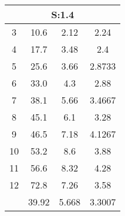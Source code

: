 
	\begin{table}[H]
		\begin{tabular}{c|ccc}
			\multicolumn{4}{c}{S:1.4}\\\hline
			3 & 10.6 & 2.12 & 2.24\\
			4 & 17.7 & 3.48 & 2.4\\
			5 & 25.6 & 3.66 & 2.8733\\
			6 & 33.0 & 4.3 & 2.88\\
			7 & 38.1 & 5.66 & 3.4667\\
			8 & 45.1 & 6.1 & 3.28\\
			9 & 46.5 & 7.18 & 4.1267\\
			10 & 53.2 & 8.6 & 3.88\\
			11 & 56.6 & 8.32 & 4.28\\
			12 & 72.8 & 7.26 & 3.58\\
			\hline
			& 39.92 & 5.668 & 3.3007\\
		\end{tabular}
	\end{table}